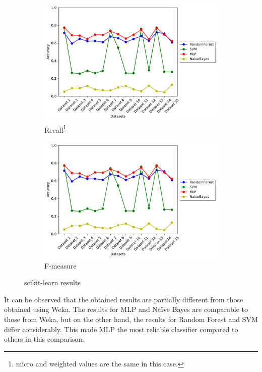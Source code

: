 \begin{figure}[H]\ContinuedFloat
\begin{subfigure}[t]{0.475\textwidth}
    \centering
    \includegraphics[page=4, width=\linewidth]{images/results_scikit.pdf}
    \caption{Recall\footnote{micro and weighted values are the same in this case.}}
    \label{fig:scikit_recall}
\end{subfigure}
\begin{subfigure}[t]{0.475\textwidth}
    \centering
    \includegraphics[page=2, width=\linewidth]{images/results_scikit.pdf}
    \caption{F-measure}
    \label{fig:scikit_f1}
\end{subfigure}
\caption{scikit-learn results}
\label{fig:scikit_results}
\end{figure}

It can be observed that the obtained results are partially different from those obtained using Weka. The results for MLP and Naïve Bayes are comparable to those from Weka, but on the other hand, the results for Random Forest and SVM differ considerably. This made MLP the most reliable classifier compared to others in this comparison.

